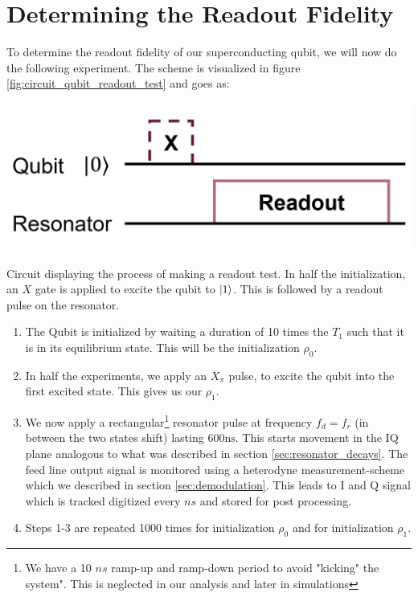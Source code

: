\section{Determining the Readout Fidelity}
To determine the readout fidelity of our superconducting qubit, we will now do the following experiment.  The scheme is visualized in figure \ref{fig:circuit_qubit_readout_test} and goes as:
\begin{marginfigure}
    \centering
    \includegraphics[]{Figs/circuits/readout_test.png}
    \caption{Circuit displaying the process of making a readout test. In half the initialization, an $X$ gate is applied to excite the qubit to $\ket{1}$. This is followed by a readout pulse on the resonator.}
    \label{fig:circuit_qubit_readout_test}
\end{marginfigure}
\begin{enumerate}
    \item The Qubit is initialized by waiting a duration of 10 times the $T_1$ such that it is in its equilibrium state. This will be the initialization $\rho_0$.
    \item In half the experiments, we apply an $X_\pi$ pulse, to excite the qubit into the first excited state. This gives us our $\rho_1$.
    \item We now apply a rectangular\footnote{We have a 10 $ns$ ramp-up and ramp-down period to avoid "kicking" the system". This is neglected in our analysis and later in simulations} resonator pulse at frequency $f_d = f_r$ (in between the two states shift) lasting $600 \text{ns}$. This starts movement in the IQ plane  analogous to what was described in section \ref{sec:resonator_decays}. The feed line output signal is monitored using a heterodyne measurement-scheme which we described in section \ref{sec:demodulation}. This leads to I and Q signal which is tracked digitized every $ns$ and stored for post processing.
    \item Steps 1-3 are repeated 1000 times for initialization $\rho_0$ and for initialization $\rho_1$.
\end{enumerate}
